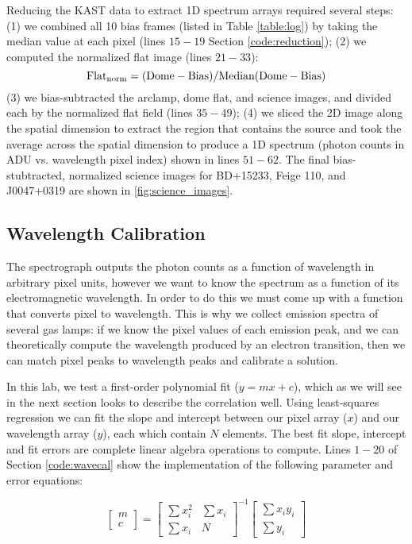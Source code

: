 \documentclass[preprint]{aastex62}
\begin{document}
Reducing the KAST data to extract 1D spectrum arrays required several steps: (1) we combined all 10 bias frames (listed in Table \ref{table:log}) by taking the median value at each pixel (lines $15-19$ Section \ref{code:reduction}); (2) we computed the normalized flat image (lines $21-33$): 
\begin{equation}
    {\rm Flat_{norm} = (Dome - Bias)/Median(Dome - Bias)} 
\end{equation}
(3) we bias-subtracted the arclamp, dome flat, and science images, and divided each by the normalized flat field (lines $35-49$); (4) we sliced the 2D image along the spatial dimension to extract the region that contains the source and took the average across the spatial dimension to produce a 1D spectrum (photon counts in ADU vs. wavelength pixel index) shown in lines $51-62$. The final bias-stubtracted, normalized science images for BD+15233, Feige 110, and J0047+0319 are shown in \ref{fig:science_images}.


\subsection{Wavelength Calibration}
The spectrograph outputs the photon counts as a function of wavelength in arbitrary pixel units, however we want to know the spectrum as a function of its electromagnetic wavelength. In order to do this we must come up with a function that converts pixel to wavelength. This is why we collect emission spectra of several gas lamps: if we know the pixel values of each emission peak, and we can theoretically compute the wavelength produced by an electron transition, then we can match pixel peaks to wavelength peaks and calibrate a solution.

In this lab, we test a first-order polynomial fit ($y=mx+c$), which as we will see in the next section looks to describe the correlation well. Using least-squares regression we can fit the slope and intercept between our pixel array ($x$) and our wavelength array ($y$), each which contain $N$ elements. The best fit slope, intercept and fit errors are complete linear algebra operations to compute. Lines $1-20$ of Section \ref{code:wavecal} show the implementation of the following parameter and error equations:

\begin{equation}
\begin{bmatrix}
    m \\ c
\end{bmatrix}
= 
\begin{bmatrix}
    \sum x_i^2 & \sum x_i \\
    \sum x_i & N
\end{bmatrix}^{-1}
\begin{bmatrix}
    \sum x_i y_i \\ \sum y_i
\end{bmatrix}
\end{equation}
\end{document}
